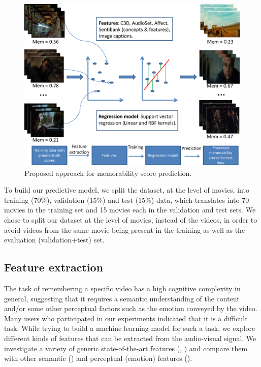 \documentclass[sigconf]{acmart}
\begin{document}
\begin{figure}[h]	  
  \centering
    \includegraphics[width=0.9\columnwidth]{figures/approach.pdf}
		\caption{Proposed approach for memorability score prediction.}
    \label{prop-apprch}
\end{figure}

To build our predictive model, we split the dataset, at the level of movies, into training (70\%), validation (15\%) and test (15\%) data, which translates into 70 movies in the training set and 15 movies each in the validation and test sets.
We chose to split our dataset at the level of movies, instead of the videos, in order to avoid videos from the same movie being present in the training as well as the evaluation (validation+test) set.

\subsection{Feature extraction}
\label{feat-extr}
The task of remembering a specific video has a high cognitive complexity in general, suggesting that it requires a semantic understanding of the content and/or some other perceptual factors such as the emotion conveyed by the video. 
Many users who participated in our experiments indicated that it is a difficult task.
While trying to build a machine learning model for such a task, we explore different kinds of features that can be extracted from the audio-visual signal.
We investigate a variety of generic state-of-the-art features (\cite{c3d-feat}, \cite{audioset-feat}) and compare them with other semantic (\cite{caption-feat}) and perceptual (emotion) features (\cite{sb-feat}).
\end{document}
